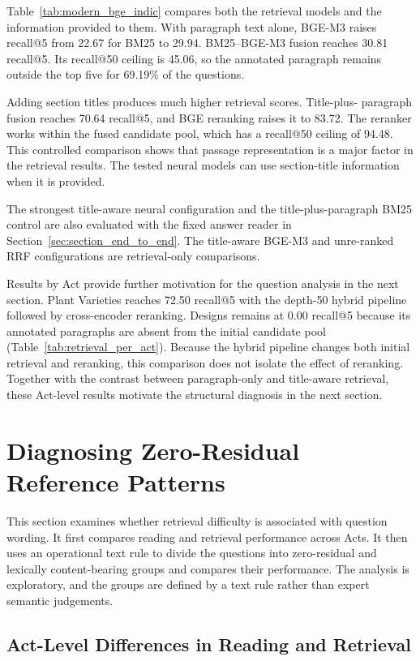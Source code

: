 \documentclass[pdflatex,sn-basic]{sn-jnl}%
\theoremstyle{thmstyleone}%
\theoremstyle{thmstyletwo}%
\theoremstyle{thmstylethree}%
\begin{document}
Table~\ref{tab:modern_bge_indic} compares both the retrieval models and the
information provided to them. With paragraph text alone, BGE-M3 raises
recall@5 from 22.67 for BM25 to 29.94. BM25--BGE-M3 fusion reaches 30.81
recall@5. Its recall@50 ceiling is 45.06, so the annotated paragraph remains
outside the top five for 69.19\% of the questions.

Adding section titles produces much higher retrieval scores. Title-plus-
paragraph fusion reaches 70.64 recall@5, and BGE reranking raises it to
83.72. The reranker works within the fused candidate pool, which has a
recall@50 ceiling of 94.48. This controlled comparison shows that passage
representation is a major factor in the retrieval results. The tested neural
models can use section-title information when it is provided.

The strongest title-aware neural configuration and the title-plus-paragraph
BM25 control are also evaluated with the fixed answer reader in
Section~\ref{sec:section_end_to_end}. The title-aware BGE-M3 and unre-ranked
RRF configurations are retrieval-only comparisons.

Results by Act provide further motivation for the question analysis in the
next section. Plant Varieties reaches 72.50 recall@5 with the depth-50 hybrid
pipeline followed by cross-encoder reranking. Designs remains at 0.00
recall@5 because its annotated paragraphs are absent from the initial
candidate pool (Table~\ref{tab:retrieval_per_act}). Because the hybrid
pipeline changes both initial retrieval and reranking, this comparison does
not isolate the effect of reranking. Together with the contrast between
paragraph-only and title-aware retrieval, these Act-level results motivate
the structural diagnosis in the next section.


\section{Diagnosing Zero-Residual Reference Patterns}
\label{sec:structural_diagnosis}

This section examines whether retrieval difficulty is associated with question wording. It first compares reading and retrieval performance across Acts. It then uses an operational text rule to divide the questions into zero-residual and lexically content-bearing groups and compares their performance. The analysis is exploratory, and the groups are defined by a text rule rather than expert semantic judgements.

\subsection{Act-Level Differences in Reading and Retrieval}
\label{sec:per_act_clue}
\end{document}
